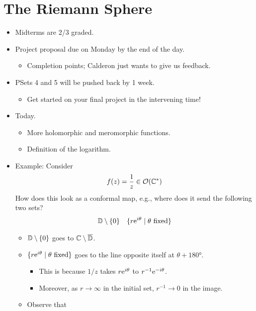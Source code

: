 \documentclass[../notes.tex]{subfiles}
\begin{document}
\section{The Riemann Sphere}
\begin{itemize}
    \item {}Midterms are 2/3 graded.
    \item Project proposal due on Monday by the end of the day.
    \begin{itemize}
        \item Completion points; Calderon just wants to give us feedback.
    \end{itemize}
    \item PSets 4 and 5 will be pushed back by 1 week.
    \begin{itemize}
        \item Get started on your final project in the intervening time!
    \end{itemize}
    \item Today.
    \begin{itemize}
        \item More holomorphic and meromorphic functions.
        \item Definition of the logarithm.
    \end{itemize}
    \item Example: Consider
    \begin{equation*}
        f(z) = \frac{1}{z}
        \in \mO(\C^*)
    \end{equation*}
    How does this look as a conformal map, e.g., where does it send the following two sets?
    \begin{align*}
        \D\setminus\{0\}&&
        \{r\e[i\theta]\mid\theta\text{ fixed}\}
    \end{align*}
    \begin{itemize}
        \item $\D\setminus\{0\}$ goes to $\C\setminus\overline{\D}$.
        \item $\{r\e[i\theta]\mid\theta\text{ fixed}\}$ goes to the line opposite itself at $\theta+\ang{180}$.
        \begin{itemize}
            \item This is because $1/z$ takes $r\e[i\theta]$ to $r^{-1}\e[-i\theta]$.
            \item Moreover, as $r\to\infty$ in the initial set, $r^{-1}\to 0$ in the image.
        \end{itemize}
        \item Observe that

\end{itemize}
\end{itemize}
\end{document}
